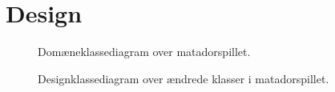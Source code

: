 \chapter{Design}\label{chap:Design}

\begin{figure}
\caption{Domæneklassediagram over matadorspillet.}\label{fig:DomainDia}
\centering

\end{figure}


\begin{figure}
\caption{Designklassediagram over ændrede klasser i matadorspillet.}\label{fig:DesignKlasseChanged}
\centering

\end{figure}